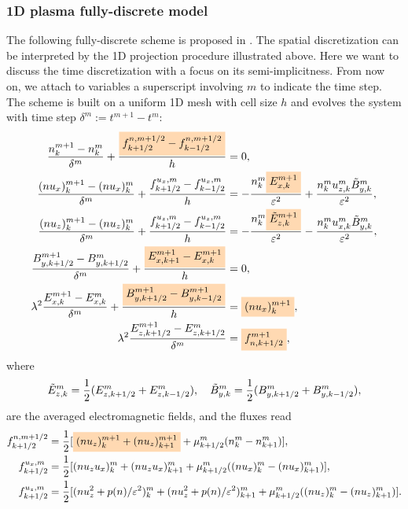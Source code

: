 \documentclass{article}
\newcommand{\mycolorbox}[2]{\colorbox{#1}{$\displaystyle#2$}}
\begin{document}
\subsubsection{1D plasma fully-discrete model} \label{sec:1d_fully_discrete_model}
The following fully-discrete scheme is proposed in \cite{degond_2012}. The spatial discretization can be interpreted by the 1D projection procedure illustrated above. Here we want to discuss the time discretization with a focus on its semi-implicitness. From now on, we attach to variables a superscript involving $m$ to indicate the time step. The scheme is built on a uniform 1D mesh with cell size $h$ and evolves the system with time step $\delta^m := t^{m+1} - t^m$:  
\begin{align*}
    \frac{n^{m+1}_k - n^m_k}{\delta^m} + \frac{\mycolorbox{orange!30}{f^{n,m+1/2}_{k+1/2} - f^{n,m+1/2}_{k-1/2}}}{h} &= 0, \\
    \frac{(nu_x)^{m+1}_k - (nu_x)^m_k}{\delta^m} + \frac{f^{u_x,m}_{k+1/2} - f^{u_x,m}_{k-1/2}}{h} &= -\frac{n^m_k \mycolorbox{orange!30}{E^{m+1}_{x,k}}}{\varepsilon^2} + \frac{n^m_k u^m_{z,k}\Tilde{B}^m_{y,k}}{\varepsilon^2},\\
    \frac{(nu_z)^{m+1}_k - (nu_z)^m_k}{\delta^m} + \frac{f^{u_z,m}_{k+1/2} - f^{u_z,m}_{k-1/2}}{h} &= - \frac{n^m_k \mycolorbox{orange!30}{\Tilde{E}^{m+1}_{z,k}}}{\varepsilon^2} - \frac{n^m_k u^m_{x,k}\Tilde{B}^m_{y,k}}{\varepsilon^2}, \\ 
    \frac{B^{m+1}_{y,k+1/2} - B^{m}_{y,k+1/2}}{\delta^m} + \frac{\mycolorbox{orange!30}{E^{m+1}_{x,k+1} - E^{m+1}_{x,k}}}{h} &= 0, \\
    \lambda^2 \frac{E^{m+1}_{x,k} - E^{m}_{x,k}}{\delta^m} + \frac{\mycolorbox{orange!30}{B^{m+1}_{y,k+1/2} - B^{m+1}_{y,k-1/2}}}{h} &= \mycolorbox{orange!30}{(nu_x)^{m+1}_k}, \\
    \lambda^2 \frac{E^{m+1}_{z,k+1/2} - E^{m}_{z,k+1/2}}{\delta^m} &= \mycolorbox{orange!30}{f^{m+1}_{n,k+1/2}}, 
\end{align*}
where 
\begin{equation*}
    \Tilde{E}^m_{z,k} = \frac{1}{2}(E^m_{z,k+1/2} + E^m_{z,k-1/2}), \ \ \ \Tilde{B}^m_{y,k} = \frac{1}{2}(B^m_{y,k+1/2} + B^m_{y,k-1/2}),
\end{equation*}
are the averaged electromagnetic fields, and the fluxes read
\begin{align*}
    f^{n,m+1/2}_{k+1/2} & = \frac{1}{2}[\mycolorbox{orange!30}{(nu_z)^{m+1}_k + (nu_z)^{m+1}_{k+1}} + \mu^m_{k+1/2}(n^m_k - n^m_{k+1})], \\
    f^{u_x,m}_{k+1/2} & = \frac{1}{2}[(nu_zu_x)^{m}_k + (nu_zu_x)^{m}_{k+1} + \mu^m_{k+1/2}((nu_x)^m_k - (nu_x)^m_{k+1})], \\
    f^{u_z,m}_{k+1/2} & = \frac{1}{2}[(nu_z^2 + p(n)/\varepsilon^2)^{m}_k + (nu_z^2 + p(n)/\varepsilon^2)^{m}_{k+1} + \mu^m_{k+1/2}((nu_z)^m_k - (nu_z)^m_{k+1})].
\end{align*}
\end{document}
